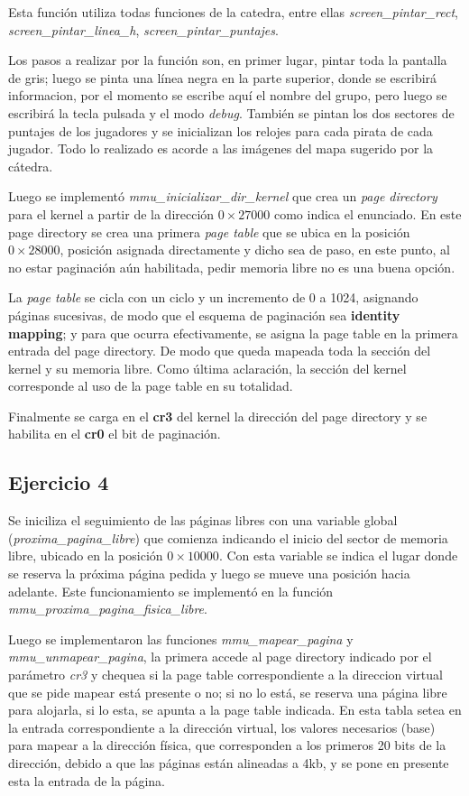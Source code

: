 Esta función utiliza todas funciones de la catedra, entre ellas
{\it screen_pintar_rect\/}, {\it screen_pintar_linea_h\/},
{\it screen_pintar_puntajes\/}.

Los pasos a realizar por la función son, en primer lugar, pintar toda la
pantalla de gris; luego se pinta una línea negra en la parte superior, donde se
escribirá informacion, por el momento se escribe aquí el nombre del grupo, pero
luego se escribirá la tecla pulsada y el modo {\it debug\/}.
También se pintan los dos sectores de puntajes de los jugadores y se inicializan
los relojes para cada pirata de cada jugador. Todo lo realizado es acorde a las
imágenes del mapa sugerido por la cátedra.

Luego se implementó {\it mmu_inicializar_dir_kernel\/} que crea un
{\it page directory\/} para el kernel a partir de la dirección $0\times27000$
como indica el enunciado. En este page directory se crea una primera
{\it page table\/} que se ubica en la posición $0\times28000$, posición
asignada directamente y dicho sea de paso, en este punto, al no estar paginación
aún habilitada, pedir memoria libre no es una buena opción.

La {\it page table\/} se cicla con un ciclo y un incremento de 0 a 1024,
asignando páginas sucesivas, de modo que el esquema de paginación sea
{\bf identity mapping}; y para que ocurra efectivamente, se asigna la page table
en la primera entrada del page directory.
De modo que queda mapeada toda la sección del kernel y su memoria libre.
Como última aclaración, la sección del kernel corresponde al uso de la page
table en su totalidad.

Finalmente se carga en el {\bf cr3} del kernel la dirección del page directory y
se habilita en el {\bf cr0} el bit de paginación.


\subsection{Ejercicio 4}

Se iniciliza el seguimiento de las páginas libres con una variable global
({\it proxima_pagina_libre\/}) que comienza indicando el inicio del sector de
memoria libre, ubicado en la posición $0\times10000$. Con esta variable se
indica el lugar donde se reserva la próxima página pedida y luego se mueve una
posición hacia adelante. Este funcionamiento se implementó en la función
{\it mmu_proxima_pagina_fisica_libre\/}.

Luego se implementaron las funciones {\it mmu_mapear_pagina\/} y
{\it mmu_unmapear_pagina\/}, la primera accede al page directory indicado por
el parámetro {\it cr3\/} y chequea si la page table correspondiente a la
direccion virtual que se pide mapear está presente o no; si no lo está, se
reserva una página libre para alojarla, si lo esta, se apunta a la page table
indicada. En esta tabla setea en la entrada correspondiente a la dirección
virtual, los valores necesarios (base) para mapear a la dirección física, que
corresponden a los primeros 20 bits de la dirección, debido a que las páginas
están alineadas a 4kb, y se pone en presente esta la entrada de la página.

